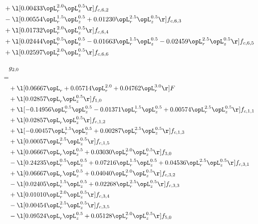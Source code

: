 \begin{alignat}{2}
& + \l[  0.00433 \opL_r^{2.0} \opL_z^{0.5}  \r] f_{c,6,2} \nonumber \\ 
& - \l[  0.00554 \opL_r^{1.5} \opL_z^{0.5} +  0.01230 \opL_r^{2.5} \opL_z^{0.5}  \r] f_{c,6,3} \nonumber \\ 
& + \l[  0.01732 \opL_r^{2.0} \opL_z^{0.5}  \r] f_{c,6,4} \nonumber \\ 
& + \l[  0.02444 \opL_r^{0.5} \opL_z^{0.5}   -0.01663 \opL_r^{1.5} \opL_z^{0.5}   -0.02459 \opL_r^{2.5} \opL_z^{0.5}  \r] f_{c,6,5} \nonumber \\ 
& + \l[  0.02597 \opL_r^{2.0} \opL_z^{0.5}  \r] f_{c,6,6} \nonumber \\ 
\end{alignat} 


\begin{alignat}{2} 
\label{eq:g_20_0} 
& g_{2,0} \nonumber \\ 
 = \\ 
& + \l[  0.06667 \opL_r +  0.05714 \opL_r^{2.0} +  0.04762 \opL_r^{3.0}  \r] F \nonumber \\ 
& + \l[  0.02857 \opL_r \opL_z^{0.5}  \r] f_{1,0} \nonumber \\ 
& + \l[  -0.14956 \opL_r^{0.5} \opL_z^{0.5}   -0.01371 \opL_r^{1.5} \opL_z^{0.5} +  0.00574 \opL_r^{2.5} \opL_z^{0.5}  \r] f_{c,1,1} \nonumber \\ 
& + \l[  0.02857 \opL_r \opL_z^{0.5}  \r] f_{c,1,2} \nonumber \\ 
& + \l[  -0.00457 \opL_r^{1.5} \opL_z^{0.5} +  0.00287 \opL_r^{2.5} \opL_z^{0.5}  \r] f_{c,1,3} \nonumber \\ 
& + \l[  0.00057 \opL_r^{2.5} \opL_z^{0.5}  \r] f_{c,1,5} \nonumber \\ 
& + \l[  0.06667 \opL_r \opL_z^{0.5} +  0.03030 \opL_r^{2.0} \opL_z^{0.5}  \r] f_{3,0} \nonumber \\ 
& - \l[  0.24235 \opL_r^{0.5} \opL_z^{0.5} +  0.07216 \opL_r^{1.5} \opL_z^{0.5} +  0.04536 \opL_r^{2.5} \opL_z^{0.5}  \r] f_{c,3,1} \nonumber \\ 
& + \l[  0.06667 \opL_r \opL_z^{0.5} +  0.04040 \opL_r^{2.0} \opL_z^{0.5}  \r] f_{c,3,2} \nonumber \\ 
& - \l[  0.02405 \opL_r^{1.5} \opL_z^{0.5} +  0.02268 \opL_r^{2.5} \opL_z^{0.5}  \r] f_{c,3,3} \nonumber \\ 
& + \l[  0.01010 \opL_r^{2.0} \opL_z^{0.5}  \r] f_{c,3,4} \nonumber \\ 
& - \l[  0.00454 \opL_r^{2.5} \opL_z^{0.5}  \r] f_{c,3,5} \nonumber \\ 
& - \l[  0.09524 \opL_r \opL_z^{0.5} +  0.05128 \opL_r^{2.0} \opL_z^{0.5}  \r] f_{5,0} \nonumber \\ 

\end{alignat}
